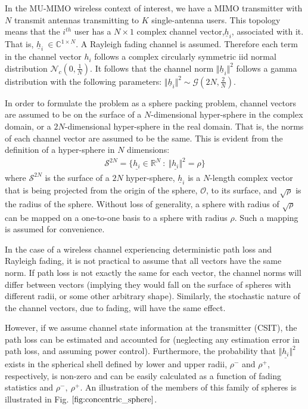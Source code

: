 In the MU-MIMO wireless context of interest, we have a MIMO transmitter with $N$ transmit antennas transmitting to $K$ single-antenna users. This topology means that the $i^{th}$ user has a  $N \times 1$ complex channel vector,$\underline{h}_i$, associated with it. That is, $\underline h_i\ \in \mathbb{C}^{1 \times N}$. A Rayleigh fading channel is assumed. Therefore each term in the channel vector $h_i$ follows a complex circularly symmetric iid normal distribution $\mathcal{N}_c(0,\frac{1}{N})$. It follows that the channel norm $\Vert \underline h_i \Vert^2$ follows a gamma distribution with the following parameters: $\Vert \underline h_i \Vert^2 \sim \mathcal{G}(2N,\frac{2}{N})$.

In order to formulate the problem as a sphere packing problem, channel vectors are assumed to be on the surface of a $N$-dimensional hyper-sphere in the complex domain, or a $2N$-dimensional hyper-sphere in the real domain. That is, the norms of each channel vector are assumed to be the same. This is evident from the definition of a hyper-sphere in $N$ dimensions:
\begin{equation}\label{eq:sphere_def}
    \begin{aligned}
        \mathcal{S}^{2N} = \lbrace \underline{h_i} \in \mathbb{R}^N \ : \ \Vert \underline{h_i} \Vert^2 = \rho \rbrace
    \end{aligned}
\end{equation}
where $\mathcal{S}^{2N}$ is the surface of a $2N$ hyper-sphere, $\underline{h}_i$ is a $N$-length complex vector that is being projected from the origin of the sphere, $\mathcal{O}$, to its surface, and $\sqrt{\rho}$ is the radius of the sphere. Without loss of generality, a sphere with radius of $\sqrt{\rho}$ can be mapped on a one-to-one basis to a sphere with radius $\rho$. Such a mapping is assumed for convenience.

In the case of a wireless channel experiencing deterministic path loss and Rayleigh fading, it is not practical to assume that all vectors have the same norm. If path loss is not exactly the same for each vector, the channel norms will differ between vectors (implying they would fall on the surface of spheres with different radii, or some other arbitrary shape). Similarly, the stochastic nature of the channel vectors, due to fading, will have the same effect.

However, if we assume channel state information at the transmitter (CSIT), the path loss can be estimated and accounted for (neglecting any estimation error in path loss, and assuming power control). Furthermore, the probability that $\Vert \underline{h_i} \Vert^2$ exists in the spherical shell defined by lower and upper radii, $\rho^-$ and $\rho^+$, respectively, is non-zero and can be easily calculated as a function of fading statistics and $\rho^-,\ \rho^+ $. An illustration of the members of this family of spheres is illustrated in Fig. $\ref{fig:concentric_sphere}$.

